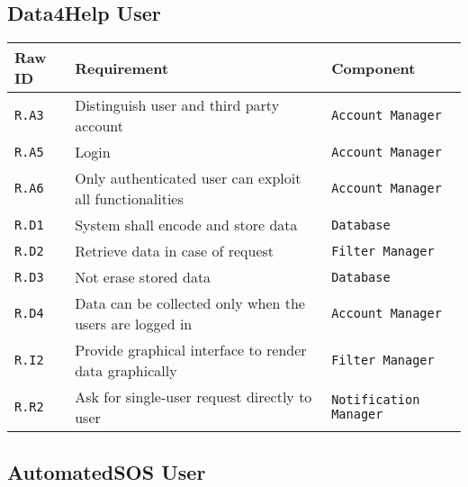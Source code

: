 \documentclass[../DD0.tex]{subfiles}
\begin{document}
\subsection{Data4Help User}

    \begin{table}[h!]

      \centering
      \begin{tabularx}{.8\linewidth}{|X|X|X|}
        \hline
        \textbf{Raw ID} & \textbf{Requirement} & \textbf{Component} \\ \hline
        \texttt{R.A3} & Distinguish user and third party account & \texttt{Account Manager} \\
        \hline
        \texttt{R.A5} & Login & \texttt{Account Manager} \\
        \hline
       \texttt{R.A6} & Only authenticated user can exploit all functionalities & \texttt{Account Manager} \\
        \hline
        \texttt{R.D1} & System shall encode and store data  & \texttt{Database} \\
        \hline
        \texttt{R.D2} & Retrieve data in case of request  & \texttt{Filter Manager} \\
        \hline
        \texttt{R.D3} & Not erase stored data  & \texttt{Database} \\
        \hline
        \texttt{R.D4} & Data can be collected only when the users are logged in &\texttt{Account Manager} \\
        \hline
        \texttt{R.I2} & Provide graphical interface to render data graphically & \texttt{Filter Manager} \\
        \hline
        \texttt{R.R2} & Ask for single-user request directly to user & \texttt{Notification Manager} \\
        \hline
      \end{tabularx}
      \label{tab:datauser}

    \end{table}

\subsection{AutomatedSOS User}
\end{document}
